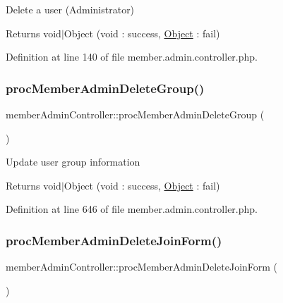 Delete a user (Administrator) \begin{DoxyReturn}{Returns}
void$\vert$\+Object (void \+: success, \hyperlink{classObject}{Object} \+: fail) 
\end{DoxyReturn}


Definition at line 140 of file member.\+admin.\+controller.\+php.

\hypertarget{classmemberAdminController_a8ee81f4eedf5dc094b5a21a9a1200849}{}\label{classmemberAdminController_a8ee81f4eedf5dc094b5a21a9a1200849} 
\subsubsection{\texorpdfstring{proc\+Member\+Admin\+Delete\+Group()}{procMemberAdminDeleteGroup()}}
{\footnotesize\ttfamily member\+Admin\+Controller\+::proc\+Member\+Admin\+Delete\+Group (\begin{DoxyParamCaption}{ }\end{DoxyParamCaption})}

Update user group information \begin{DoxyReturn}{Returns}
void$\vert$\+Object (void \+: success, \hyperlink{classObject}{Object} \+: fail) 
\end{DoxyReturn}


Definition at line 646 of file member.\+admin.\+controller.\+php.

\hypertarget{classmemberAdminController_a0f31e7762e615b195d826f24d87a4f68}{}\label{classmemberAdminController_a0f31e7762e615b195d826f24d87a4f68} 
\subsubsection{\texorpdfstring{proc\+Member\+Admin\+Delete\+Join\+Form()}{procMemberAdminDeleteJoinForm()}}
{\footnotesize\ttfamily member\+Admin\+Controller\+::proc\+Member\+Admin\+Delete\+Join\+Form (\begin{DoxyParamCaption}{ }\end{DoxyParamCaption})}

